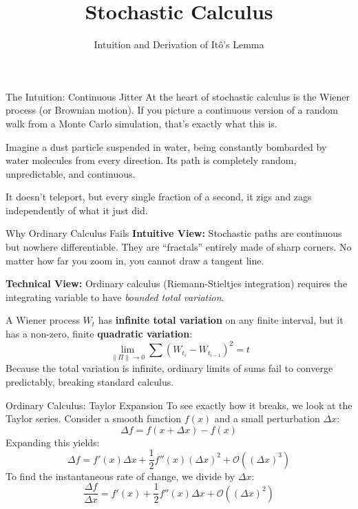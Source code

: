 \documentclass{beamer}
\title{Stochastic Calculus}
\subtitle{Intuition and Derivation of It\^o's Lemma}
\date{}
\begin{document}
\begin{frame}
\titlepage
\end{frame}

\begin{frame}{The Intuition: Continuous Jitter}
At the heart of stochastic calculus is the Wiener process (or Brownian motion). If you picture a continuous version of a random walk from a Monte Carlo simulation, that’s exactly what this is.
\medskip

Imagine a dust particle suspended in water, being constantly bombarded by water molecules from every direction. Its path is completely random, unpredictable, and continuous.
\medskip

It doesn't teleport, but every single fraction of a second, it zigs and zags independently of what it just did.
\end{frame}

\begin{frame}{Why Ordinary Calculus Fails}
\textbf{Intuitive View:} Stochastic paths are continuous but nowhere differentiable. They are ``fractals'' entirely made of sharp corners. No matter how far you zoom in, you cannot draw a tangent line.
\medskip

\textbf{Technical View:} Ordinary calculus (Riemann-Stieltjes integration) requires the integrating variable to have \textit{bounded total variation}. 
\medskip

A Wiener process $W_t$ has \textbf{infinite total variation} on any finite interval, but it has a non-zero, finite \textbf{quadratic variation}:
\[
\lim_{\|\Pi\| \to 0} \sum (W_{t_i} - W_{t_{i-1}})^2 = t
\]
Because the total variation is infinite, ordinary limits of sums fail to converge predictably, breaking standard calculus.
\end{frame}

\begin{frame}{Ordinary Calculus: Taylor Expansion}
To see exactly how it breaks, we look at the Taylor series. Consider a smooth function $f(x)$ and a small perturbation $\Delta x$:
\[
\Delta f = f(x + \Delta x) - f(x)
\]
Expanding this yields:
\[
\Delta f = f'(x)\Delta x + \frac{1}{2}f''(x)(\Delta x)^2 + \mathcal{O}((\Delta x)^3)
\]
To find the instantaneous rate of change, we divide by $\Delta x$:
\[
\frac{\Delta f}{\Delta x} = f'(x) + \frac{1}{2}f''(x)\Delta x + \mathcal{O}((\Delta x)^2)
\]
\end{frame}
\end{document}
